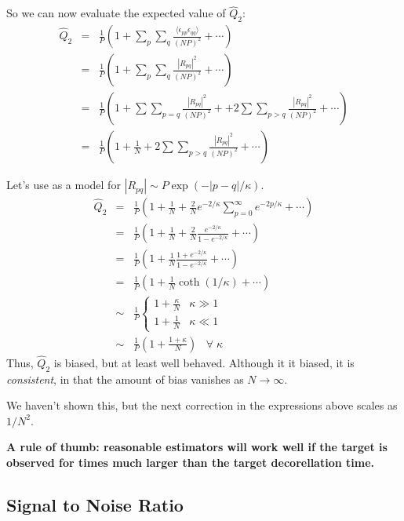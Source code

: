 So we can now evaluate the expected value of $\hat{Q}_2$:
\begin{eqnarray}
\hat{Q}_2 &=& \frac{1}{P} \left( 1 + \sum_p \sum_q \frac{\langle
    \epsilon_{pp} \epsilon_{qq}\rangle}{(NP)^2} + \cdots \right)
\nonumber \\
&=& \frac{1}{P} \left(1 + \sum_p \sum_q \frac{|R_{pq}|^2}{(NP)^2} +
  \cdots \right) \\
&=& \frac{1}{P} \left(1 + \sum\sum_{p=q} \frac{|R_{pq}|^2}{(NP)^2} +
+ 2\sum\sum_{p>q} \frac{|R_{pq}|^2}{(NP)^2} 
+ \cdots \right) \\
&=& \frac{1}{P} \left(1 
+ \frac{1}{N} 
+ 2\sum\sum_{p>q} \frac{|R_{pq}|^2}{(NP)^2} + \cdots \right) 
\end{eqnarray}

Let's use as a model for $|R_{pq}| \sim P\exp(-|p-q|/\kappa)$. 
\begin{eqnarray}
\hat{Q}_2 &=& \frac{1}{P} \left(1 + \frac{1}{N} 
+ \frac{2}{N} e^{-2/\kappa}\sum_{p=0}^\infty e^{-2p/\kappa} + \cdots
\right) \\
 &=& \frac{1}{P} \left(1 + \frac{1}{N} 
+ \frac{2}{N} \frac{e^{-2/\kappa}}{1 - e^{-2/\kappa}} + \cdots \right)
\\
&=& \frac{1}{P} \left(1 + \frac{1}{N} \frac{1 + e^{-2/\kappa}}{1 -
    e^{-2/\kappa}} + \cdots \right)\\
&=& \frac{1}{P} \left(1 + \frac{1}{N} \coth(1/\kappa) +  \cdots  \right) \\
&\sim& \frac{1}{P}\left\{\begin{array}{ll}
1 + \frac{\kappa}{N} & \kappa \gg 1 \\[0.5em]
1 + \frac{1}{N} & \kappa \ll 1
\end{array} \right. \\
&\sim& \frac{1}{P}\left(1 + \frac{1 + \kappa}{N}\right) \;\;\; \forall
\; \kappa
\end{eqnarray}
Thus, $\hat{Q}_2$ is biased, but at least well behaved.  Although it
it biased, it is \textit{consistent}, in that the amount of bias
vanishes as $N \rightarrow \infty$.

We haven't shown this, but the next correction in the expressions
above scales as $1/N^2$.

\vspace{1em}

\noindent \textbf{A rule of thumb: reasonable estimators will
work well if the target is observed for times much larger than the
target decorellation time.}


\subsection{Signal to Noise Ratio}

